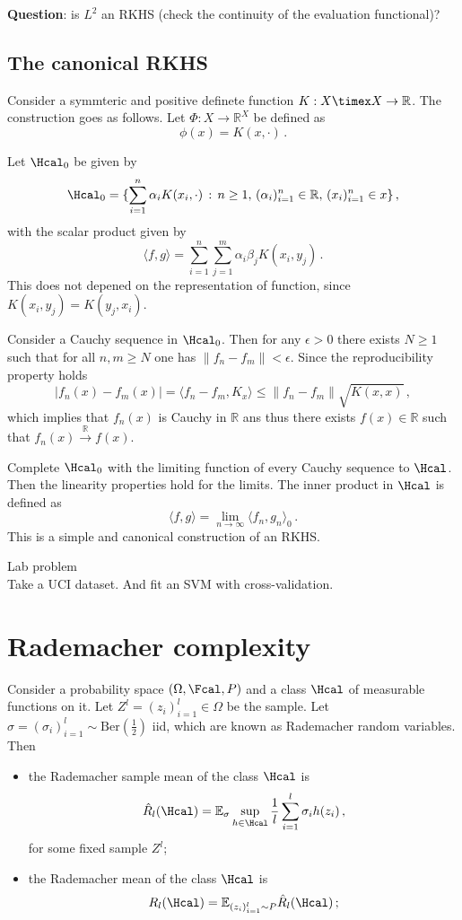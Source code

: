 \documentclass[a4paper]{article}
\newcommand{\Real}{\mathbb{R}}
\newcommand{\ex}{\mathbb{E}}
\begin{document}
\textbf{Question}: is $L^2$ an RKHS (check the continuity of the evaluation functional)?


\subsection{The canonical RKHS} %
\label{sub:the_canonical_rkhs}

Consider a symmteric and positive definete function $K:X\timex X\to \Real$.
The construction goes as follows. Let $\Phi:X\to \Real^X$ be defined as 
\[ \phi(x) = K(x, \cdot) \,. \]

Let $\Hcal_0$ be given by
\[ \Hcal_0 = \{ \sum_{i=1}^n \alpha_i K(x_i,\cdot) \,:\,
				n\geq 1,\,(\alpha_i)_{i=1}^n \in \Real,\, (x_i)_{i=1}^n \in x\} \,, \]
with the scalar product given by
\[ \langle f, g\rangle = \sum_{i=1}^n \sum_{j=1}^m \alpha_i \beta_j K(x_i, y_j) \,. \]
This does not depened on the representation of function, since $K(x_i, y_j) = K(y_j, x_i)$.

Consider a Cauchy sequence in $\Hcal_0$. Then for any $\epsilon>0$ there exists
$N\geq1$ such that for all $n,m \geq N$ one has $\|f_n-f_m\| < \epsilon$. Since
the reproducibility property holds
\[ |f_n(x) - f_m(x)| = \langle f_n-f_m, K_x\rangle \leq \|f_n-f_m\| \sqrt{ K(x,x)} \,, \]
which implies that $f_n(x)$ is Cauchy in $\Real$ ans thus there exists $f(x)\in \Real$
such that $f_n(x)\overset{\Real}{\to}f(x)$.

Complete $\Hcal_0$ with the limiting function of every Cauchy sequence to $\Hcal$.
Then the linearity properties hold for the limits. The inner product in $\Hcal$
is defined as
\[ \langle f, g \rangle = \lim_{n\to \infty} \langle f_n,g_n\rangle_0 \,. \]
This is a simple and canonical construction of an RKHS.


\noindent Lab problem\hfill \\
Take a UCI dataset. And fit an SVM with cross-validation.

\section{Rademacher complexity} %
\label{sec:rademacher_complexity}

Consider a probability space $(\Omega, \Fcal, P)$ and a class $\Hcal$ of measurable
functions on it. Let $Z^l = (z_i)_{i=1}^l\in \Omega$ be the sample. Let
$\sigma=(\sigma_i)_{i=1}^l\sim\text{Ber}(\frac{1}{2})$ iid, which are known as
Rademacher random variables. Then \begin{itemize}
	\item the Rademacher sample mean of the class $\Hcal$ is
	\[ \hat{R}_l(\Hcal) = \ex_\sigma \sup_{h\in \Hcal} \frac{1}{l} \sum_{i=1}^l \sigma_i h(z_i) \,,\]
	for some fixed sample $Z^l$;
	\item the Rademacher mean of the class $\Hcal$ is 
	\[ R_l(\Hcal) = \ex_{(z_i)_{i=1}^l\sim P}\hat{R}_l(\Hcal) \,; \]
\end{itemize}
\end{document}
